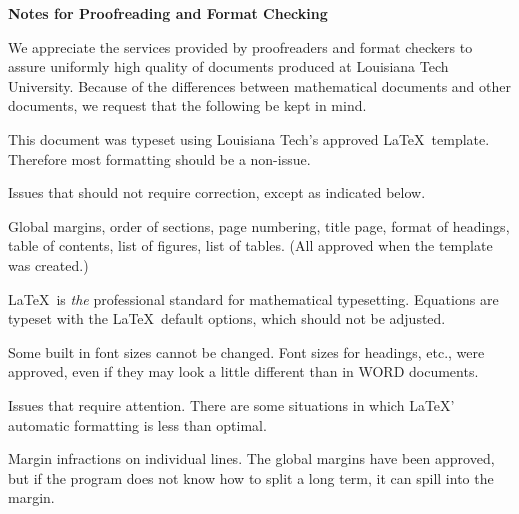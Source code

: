 \documentclass{LA_Tech}
\renewenvironment{itemize}{%
\vspace{-.15in} %
    \begin{olditemize}%
\setlength{\parsep}{0ex}
\setlength{\topsep}{0ex}
\setlength{\partopsep}{0ex}
      \setlength{\parskip}{0pt}%
      \setlength{\itemsep}{0pt}%
  }%
  {%
    \end{olditemize}%
  }
\numberwithin{equation}{chapter}
\begin{document}
\begin{singlespace}

\centerline{\bf Notes for Proofreading and Format Checking}

\vspace{.1in}


We appreciate the services provided by proofreaders and
format checkers to assure uniformly high quality of documents
produced at Louisiana Tech University.
Because of the differences between mathematical
documents and other documents, we request that the following
be kept in mind.

\begin{itemize}
\item
This document was typeset using Louisiana Tech's approved
\LaTeX \ template. Therefore most formatting
should be a non-issue.

\item
Issues that should not require correction, except
as indicated below.

\vspace{.1in} %

\begin{itemize}
\item
Global margins, order of sections, page numbering,
title page, format of
headings, table of contents, list of figures, list of tables.
(All approved when the template was created.)

\item
\LaTeX \ is {\em the} professional standard for mathematical typesetting.
Equations are typeset with
the \LaTeX \ default options, which should not be adjusted.

\item
Some built in font sizes cannot be changed.
Font sizes for headings, etc.,
were approved, even if they may look a little different
than in WORD documents.

\end{itemize}

\item
Issues that require attention.
There are some situations in which
\LaTeX' automatic formatting is less than optimal.

\vspace{.1in} %

\begin{itemize}
\item
Margin infractions on individual lines.
The global margins have been approved, but if the program
does not know how to split a long term, it can spill into the margin.


\end{itemize}
\end{itemize}
\end{singlespace}
\end{document}
